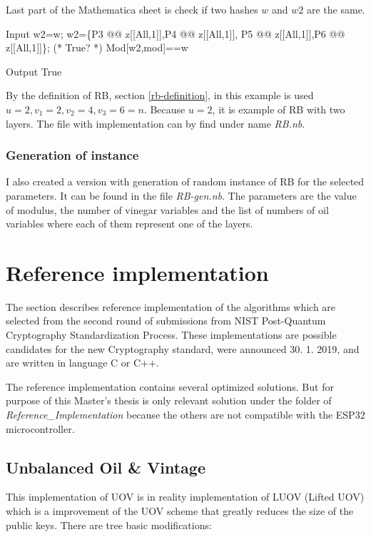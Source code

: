 \documentclass[thesis=M,english]{FITthesis}[2019/12/23]
\begin{document}
\bigskip
\noindent
Last part of the Mathematica sheet is check if two hashes $w$ and $w2$ are the same.
\begin{mmaCell}[moredefined={w2, w, P5, P6, z, P4, P3, mod}]{Input}
  w2=w;
  w2=\{P3 @@ z[[All,1]],P4 @@ z[[All,1]],
      P5 @@ z[[All,1]],P6 @@ z[[All,1]]\};
  (* True? *)
  Mod[w2,mod]==w
\end{mmaCell}
\begin{mmaCell}[addtoindex=2]{Output}
  True
\end{mmaCell}
By the definition of RB, section \ref{rb-definition}, in this example is used $u=2, v_1=2, v_2=4, v_3=6=n$. Because $u=2$, it is example of RB with two layers.
The file with implementation can by find under name \textit{RB.nb}.

\subsubsection{Generation of instance}
I also created a version with generation of random instance of RB for the selected parameters. It can be found in the file \textit{RB-gen.nb}. The parameters are the value of modulus, the number of vinegar variables and the list of numbers of oil variables where each of them represent one of the layers.

\newpage
\lstset{basicstyle=\footnotesize\ttfamily}
\section{Reference implementation}
The section describes reference implementation of the algorithms which are selected from the second round of submissions from NIST Post-Quantum Cryptography Standardization Process.\cite{L-NIST-2ND} These implementations are possible candidates for the new Cryptography standard, were announced 30. 1. 2019, and are written in language C or C++. 

\bigskip
\noindent
The reference implementation contains several optimized solutions. But for purpose of this Master's thesis is only relevant solution under the folder of \textit{Reference\_Implementation} because the others are not compatible with the ESP32 microcontroller.

\subsection{Unbalanced Oil \& Vintage}
This implementation of UOV is in reality implementation of LUOV (Lifted UOV) which is a improvement of the UOV scheme that greatly reduces the size of the public keys. There are tree basic modifications:
\end{document}
